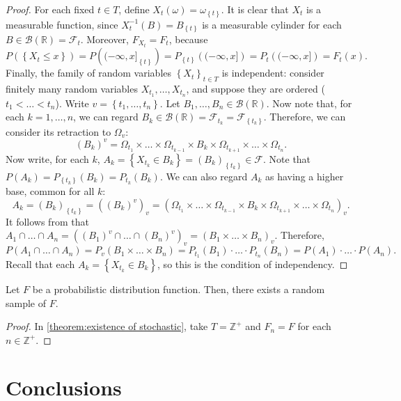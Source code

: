 \begin{proof}
		For each fixed \(t\in T\), define \(X_t(\omega)=\omega_{\left\{t\right\}}\). It is clear that \(X_t\) is a measurable function, since \(X_t^{-1}(B)=B_{\left\{t\right\}}\) is a measurable cylinder for each \(B\in\mathscr{B}\left(\mathbb{R}\right)=\mathcal{F}_t\). Moreover, \(F_{X_t}=F_t\), because
		\[
				P\left(\left\{X_t\leq x\right\}\right)=P\left( (-\infty,x]_{\left\{t\right\}}\right)=P_{\left\{t\right\}}\left( (-\infty,x]\right)=P_{t}\left( (-\infty,x]\right)=F_t(x)
		.\]
		Finally, the family of random variables \(\left\{X_t\right\}_{t\in T}\) is independent: consider finitely many random variables \(X_{t_1},\dots,X_{t_n}\), and suppose they are ordered (\(t_1<\dots<t_n\)). Write \(v=\left\{t_1,\dots,t_n\right\}\). Let \(B_{1},\dots,B_{n}\in\mathscr{B}\left(\mathbb{R}\right)\). Now note that, for each \(k=1,\dots,n\), we can regard \(B_k\in\mathscr{B}\left(\mathbb{R}\right)=\mathcal{F}_{t_k}=\mathcal{F}_{\left\{t_k\right\}}\). Therefore, we can consider its retraction to \(\Omega_v\):
		\[
				\left(B_k\right)^v=\Omega_{t_1}\times\dots\times\Omega_{t_{k-1}}\times B_k\times\Omega_{t_{k+1}}\times\dots\times\Omega_{t_n}
		.\]
		Now write, for each \(k\), \(A_k=\left\{X_{t_k}\in B_{k}\right\}=\left(B_{k}\right)_{\left\{t_k\right\}}\in\mathcal{F}\). Note that \(P(A_k)=P_{\left\{t_k\right\}}(B_k)=P_{t_k}(B_k)\). We can also regard \(A_k\) as having a higher base, common for all \(k\):
		\[
				A_k=\left(B_k\right)_{\left\{t_k\right\}}=\left( \left(B_k\right)^v\right)_v=\left(\Omega_{t_1}\times\dots\times\Omega_{t_{k-1}}\times B_k\times\Omega_{t_{k+1}}\times\dots\times\Omega_{t_n}\right)_v
		.\]
		It follows from  that \(A_1\cap\dots\cap A_n=\left( \left(B_1\right)^v\cap\dots\cap \left(B_n\right)^v\right)_v=\left(B_1\times\dots\times B_n\right)_v\).
		Therefore,
		\[
				P\left(A_1\cap\dots\cap A_n\right)=P_v(B_1\times\dots\times B_n)=P_{t_1}(B_1)\cdot\dotsc\cdot P_{t_n}(B_n)=P(A_1)\cdot\dotsc\cdot P(A_n)
		.\]
		Recall that each \(A_k=\left\{X_{t_k}\in B_k\right\}\), so this is the condition of independency.
\end{proof}
\begin{corl}
		Let \(F\) be a probabilistic distribution function. Then, there exists a random sample of \(F\).
\end{corl}
\begin{proof}
		In \cref{theorem:existence of stochastic}, take \(T=\mathbb{Z}^+\) and \(F_n=F\) for each \(n\in\mathbb{Z}^+\).
\end{proof}
\section*{Conclusions}\label{section:Conclusions}


